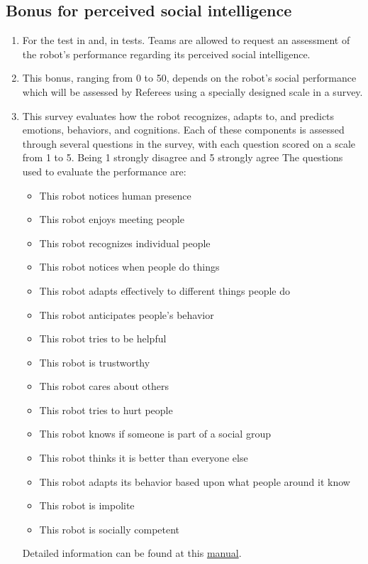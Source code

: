 \subsection{Bonus for perceived social intelligence}\label{rule:perceived_intelligence}
\begin{enumerate}	
    \item For the test  in  and,  in  tests. Teams are allowed to request an assessment of the robot's performance regarding its perceived social intelligence.
    
    \item This bonus, ranging from 0 to 50, depends on the robot's social performance which will be assessed by Referees using a specially designed scale in a survey.

    \item This survey evaluates how the robot recognizes, adapts to, and predicts emotions, behaviors, and cognitions. Each of these components is assessed through several questions in the survey, with each question scored on a scale from 1 to 5. Being 1 strongly disagree and 5 strongly agree  The questions used to evaluate the performance are:
    \begin{itemize}
        \item This robot notices human presence
        \item This robot enjoys meeting people
        \item This robot recognizes individual people
        \item This robot notices when people do things
        \item This robot adapts effectively to different things people do
        \item This robot anticipates people's behavior
        \item This robot tries to be helpful
        \item This robot is trustworthy
        \item This robot cares about others
        \item This robot tries to hurt people
        \item This robot knows if someone is part of a social group
        \item This robot thinks it is better than everyone else
        \item This robot adapts its behavior based upon what people around it know
        \item This robot is impolite
        \item This robot is socially competent
    \end{itemize}
    Detailed information can be found at this \href{https://ipip.ori.org/PSIManualSeptember2018.pdf}{manual}.
    

\end{enumerate}
